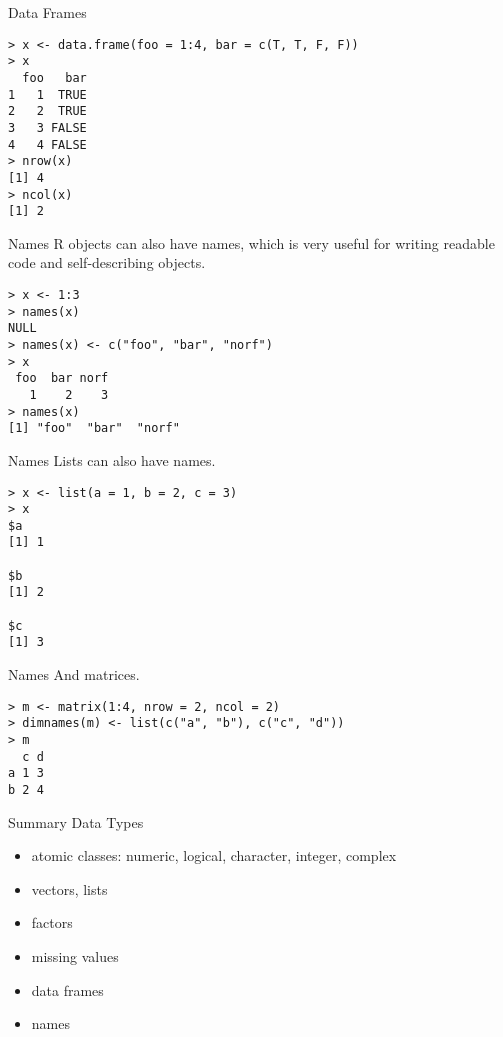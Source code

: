 \documentclass[aspectratio=169]{beamer}
\begin{document}
\begin{frame}[fragile]{Data Frames}
\begin{verbatim}
> x <- data.frame(foo = 1:4, bar = c(T, T, F, F))
> x
  foo   bar
1   1  TRUE
2   2  TRUE
3   3 FALSE
4   4 FALSE
> nrow(x)
[1] 4
> ncol(x)
[1] 2
\end{verbatim}
\end{frame}

\begin{frame}[fragile]{Names}
R objects can also have names, which is very useful for writing
readable code and self-describing objects.
\begin{verbatim}
> x <- 1:3
> names(x)
NULL
> names(x) <- c("foo", "bar", "norf")
> x
 foo  bar norf 
   1    2    3 
> names(x)
[1] "foo"  "bar"  "norf"
\end{verbatim}
\end{frame}

\begin{frame}[fragile]{Names}
Lists can also have names.
\begin{verbatim}
> x <- list(a = 1, b = 2, c = 3)
> x
$a
[1] 1

$b
[1] 2

$c
[1] 3
\end{verbatim}
\end{frame}

\begin{frame}[fragile]{Names}
And matrices.
\begin{verbatim}
> m <- matrix(1:4, nrow = 2, ncol = 2)
> dimnames(m) <- list(c("a", "b"), c("c", "d"))
> m
  c d
a 1 3
b 2 4
\end{verbatim}
\end{frame}

\begin{frame}[fragile]{Summary}
Data Types
\begin{itemize}
\item atomic classes: numeric, logical, character, integer, complex
\item vectors, lists
\item factors
\item missing values
\item data frames
\item names
\end{itemize}
\end{frame}
\end{document}
